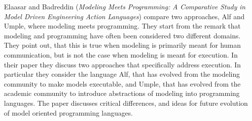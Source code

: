 


Elaasar and Badreddin
\cite{isola-2016-elaasar}
({\em Modeling Meets Programming: A Comparative Study in
Model Driven Engineering Action Languages})
compare two approaches, Alf and Umple, where modeling meets programming. They start from the remark that modeling and programming have often been considered two different domains. They point out, that this is true when modeling is primarily meant for human communication, but is not the case when modeling is meant for execution. In their paper they discuss two approaches that specifically address execution. In particular they consider the language Alf, that has evolved from the modeling community to make models executable, and Umple, that has evolved from the academic community to introduce abstractions of modeling into programming languages. The paper discusses critical differences, and ideas for future evolution of model oriented programming languages.
 
